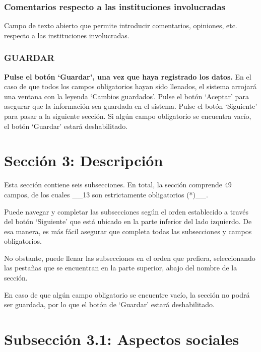 \documentclass[
]{book}
\begin{document}
\hypertarget{comentarios-respecto-a-las-instituciones-involucradas}{%
\subsection{Comentarios respecto a las instituciones involucradas}\label{comentarios-respecto-a-las-instituciones-involucradas}}

Campo de texto abierto que permite introducir comentarios, opiniones, etc. respecto a las instituciones involucradas.

\hypertarget{guardar-2}{%
\subsection{GUARDAR}\label{guardar-2}}

\textbf{Pulse el botón `Guardar', una vez que haya registrado los datos.}
En el caso de que todos los campos obligatorios hayan sido llenados, el sistema arrojará una ventana con la leyenda `Cambios guardados'. Pulse el botón `Aceptar' para asegurar que la información sea guardada en el sistema.
Pulse el botón `Siguiente' para pasar a la siguiente sección.
Si algún campo obligatorio se encuentra vacío, el botón `Guardar' estará deshabilitado.

\hypertarget{secciuxf3n-3-descripciuxf3n}{%
\chapter*{Sección 3: Descripción}\label{secciuxf3n-3-descripciuxf3n}}

Esta sección contiene seis subsecciones. En total, la sección comprende 49 campos, de los cuales \_\_13 son estrictamente obligatorios (*)\_\_.

Puede navegar y completar las subsecciones según el orden establecido a través del botón `Siguiente' que está ubicado en la parte inferior del lado izquierdo. De esa manera, es más fácil asegurar que completa todas las subsecciones y campos obligatorios.

No obstante, puede llenar las subsecciones en el orden que prefiera, seleccionando las pestañas que se encuentran en la parte superior, abajo del nombre de la sección.

En caso de que algún campo obligatorio se encuentre vacío, la sección no podrá ser guardada, por lo que el botón de `Guardar' estará deshabilitado.

\hypertarget{subsecciuxf3n-3.1-aspectos-sociales}{%
\chapter*{Subsección 3.1: Aspectos sociales}\label{subsecciuxf3n-3.1-aspectos-sociales}}
\end{document}
